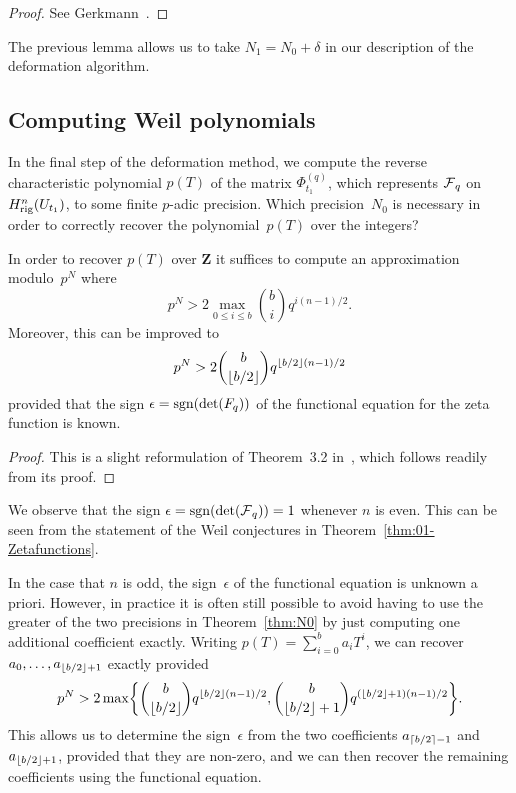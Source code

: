 \begin{proof} 
See Gerkmann~\citep[Lemma~3.3, Lemma~3.4]{Gerkmann2007}.
\end{proof}

The previous lemma allows us to take $N_1 = N_0 + \delta$ in our 
description of the deformation algorithm.

\subsection{Computing Weil polynomials}

In the final step of the deformation method, we compute the 
reverse characteristic polynomial $p(T)$ of the matrix $\Phi_{t_1}^{(q)}$, 
which represents $\operatorname{\mathcal{F}}_q$ on $H_{\text{rig}}^n(U_{t_1})$, to some finite 
$p$-adic precision.  Which precision~$N_0$ is necessary in order to 
correctly recover the polynomial~$p(T)$ over the integers?

\begin{thm} \label{thm:N0}
In order to recover $p(T)$ over $\mathbf{Z}$ it suffices to compute 
an approximation modulo~$p^N$ where 
\begin{equation*}
p^N > 2 \max_{0 \leq i \leq b} \binom{b}{i} q^{i (n-1) / 2}.
\end{equation*}
Moreover, this can be improved to 
\begin{equation*}
p^N > 2 \binom{b}{\left\lfloor b/2\right\rfloor} q^{\left\lfloor b/2\right\rfloor (n-1) / 2}
\end{equation*}
provided that the sign $\epsilon = \operatorname{sgn}(\det(F_q))$ of the 
functional equation for the zeta function is known.
\end{thm}

\begin{proof}
This is a slight reformulation of {Theorem~3.2} in~\citep{Gerkmann2007}, 
which follows readily from its proof.
\end{proof}

\begin{rem}
We observe that the sign $\epsilon = \operatorname{sgn}(\det(\operatorname{\mathcal{F}}_q)) = 1$ 
whenever $n$ is even.  This can be seen from the statement of the 
Weil conjectures in Theorem~\ref{thm:01-Zetafunctions}.
\end{rem}

\begin{rem}
In the case that $n$ is odd, the sign~$\epsilon$ of the functional 
equation is unknown a priori.  However, in practice it is often still 
possible to avoid having to use the greater of the two precisions in 
Theorem~\ref{thm:N0} by just computing one additional coefficient 
exactly.  Writing $p(T) = \sum_{i=0}^{b} a_i T^i$, we can recover 
$a_0, \dotsc, a_{\left\lfloor b/2\right\rfloor+1}$ exactly provided 
\begin{equation*}
p^N > 2 \max\biggl\{\binom{b}{\left\lfloor b/2\right\rfloor} q^{\left\lfloor b/2\right\rfloor (n-1) / 2}, 
                   \binom{b}{\left\lfloor b/2\right\rfloor+1} q^{(\left\lfloor b/2\right\rfloor+1) (n-1)/2} \biggr\}.
\end{equation*}
This allows us to determine the sign~$\epsilon$ from the two 
coefficients $a_{\left\lceil b/2\right\rceil-1}$ and $a_{\left\lfloor b/2\right\rfloor+1}$, provided 
that they are non-zero, and we can then recover the remaining 
coefficients using the functional equation.
\end{rem}

